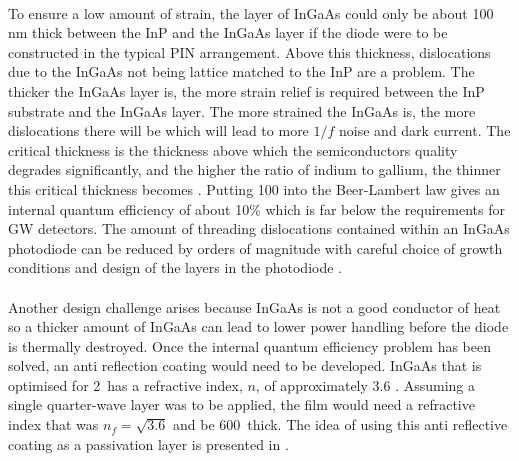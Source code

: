 \paragraph{}
To ensure a low amount of strain, the layer of InGaAs could only be about 100\,nm thick between the InP and the InGaAs layer if the diode were to be constructed in the typical PIN arrangement. Above this thickness, dislocations due to the InGaAs not being lattice matched to the InP are a problem. The thicker the InGaAs layer is, the more strain relief is required between the InP substrate and the InGaAs layer. The more strained the InGaAs is, the more dislocations there will be which will lead to more $1/f$ noise and dark current. The critical thickness is the thickness above which the semiconductors quality degrades significantly, and the higher the ratio of indium to gallium, the thinner this critical thickness becomes \cite{Anan1992}. Putting 100\SIunits{\,\nano\metre} into the Beer-Lambert law gives an internal quantum efficiency of about 10\% which is far below the requirements for GW detectors. The amount of threading dislocations contained within an InGaAs photodiode can be reduced by orders of magnitude with careful choice of growth conditions and design of the layers in the photodiode \cite{Chen2018}\cite{Zimmermann2003}.
\paragraph{}
Another design challenge arises because InGaAs is not a good conductor of heat so a thicker amount of InGaAs can lead to lower power handling before the diode is thermally destroyed\cite{Li2004}. Once the internal quantum efficiency problem has been solved, an anti reflection coating would need to be developed. InGaAs that is optimised for 2\,\SIunits{\micro\metre} has a refractive index, $n$, of approximately $3.6$ \cite{Alam2007}. Assuming a single quarter-wave layer was to be applied, the film would need a refractive index that was $n_f = \sqrt{3.6}$ and be 600\,\SIunits{\nano\meter} thick. The idea of using this anti reflective coating as a passivation layer is presented in \cite{L_pez_2007}. 
